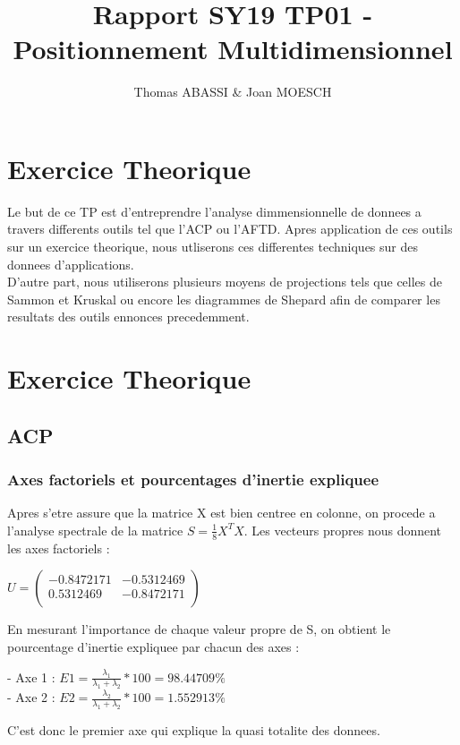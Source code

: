 \documentclass[a4paper,11pt]{article}
\title{Rapport SY19 TP01 - Positionnement Multidimensionnel}
\author{Thomas ABASSI \& Joan MOESCH}
\begin{document}
\maketitle

\section{Exercice Theorique}
\noindent Le but de ce TP est d'entreprendre l'analyse dimmensionnelle de donnees a travers differents outils tel que l'ACP ou l'AFTD. Apres application de ces outils sur un exercice theorique, nous utliserons ces differentes techniques sur des donnees d'applications. \\

\noindent D'autre part, nous utiliserons plusieurs moyens de projections tels que celles de Sammon et Kruskal ou encore les diagrammes de Shepard afin de comparer les resultats des outils ennonces precedemment.
\section{Exercice Theorique}

\subsection{ACP}

\subsubsection{Axes factoriels et pourcentages d'inertie expliquee}

\noindent Apres s'etre assure que la matrice X est bien centree en colonne, on procede a l'analyse spectrale de la matrice $S = \frac{1}{8} X^T X $. Les vecteurs propres nous donnent les axes factoriels : 
\begin{center}
$U = \begin{pmatrix}
-0.8472171&-0.5312469\\
0.5312469&-0.8472171\\
\end{pmatrix}$
\end{center}


\noindent En mesurant l'importance de chaque valeur propre de S, on obtient le pourcentage d'inertie expliquee par chacun des axes :
\begin{center}
- Axe 1 : $E1 = \frac{\lambda_1}{\lambda_1 + \lambda_2} * 100 = 98.44709 \%$\\
- Axe 2 : $E2 = \frac{\lambda_2}{\lambda_1 + \lambda_2} * 100 = 1.552913 \%$\\
\end{center}
\noindent C'est donc le premier axe qui explique la quasi totalite des donnees.\\
\end{document}
